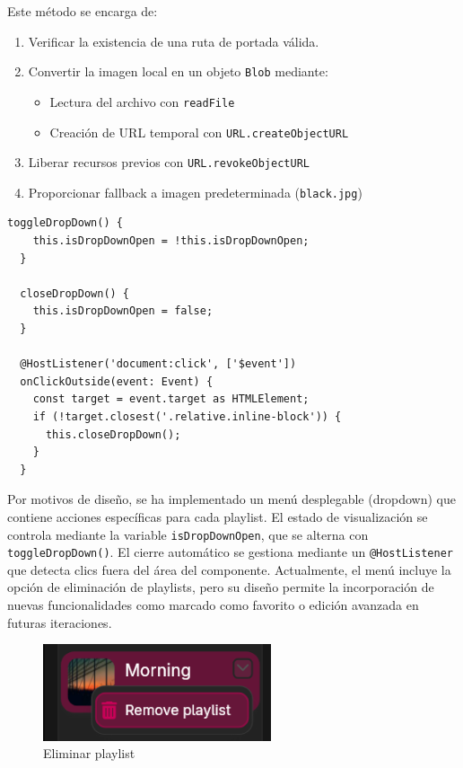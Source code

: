 \documentclass[11pt, a4paper]{article}
\begin{document}
                Este método se encarga de:
                \begin{enumerate}
                    \item Verificar la existencia de una ruta de portada válida.
                    \item Convertir la imagen local en un objeto \verb|Blob| mediante:
                    \begin{itemize}
                        \item Lectura del archivo con \verb|readFile|
                        \item Creación de URL temporal con \verb|URL.createObjectURL|
                    \end{itemize}
                    \item Liberar recursos previos con \verb|URL.revokeObjectURL|
                    \item Proporcionar fallback a imagen predeterminada (\verb|black.jpg|)
                \end{enumerate}

                \begin{lstlisting}[caption={Dropdown}]
toggleDropDown() {
    this.isDropDownOpen = !this.isDropDownOpen;
  }

  closeDropDown() {
    this.isDropDownOpen = false;
  }

  @HostListener('document:click', ['$event'])
  onClickOutside(event: Event) {
    const target = event.target as HTMLElement;
    if (!target.closest('.relative.inline-block')) {
      this.closeDropDown();
    }
  }
                \end{lstlisting}

                Por motivos de diseño, se ha implementado un menú desplegable (dropdown) que contiene acciones específicas para cada playlist. El estado de visualización se controla mediante la variable \verb|isDropDownOpen|, que se alterna con \verb|toggleDropDown()|. El cierre automático se gestiona mediante un \verb|@HostListener| que detecta clics fuera del área del componente. Actualmente, el menú incluye la opción de eliminación de playlists, pero su diseño permite la incorporación de nuevas funcionalidades como marcado como favorito o edición avanzada en futuras iteraciones.

                \begin{figure}[H]
                    \centering
                    \includegraphics[width=0.6\textwidth]{media/screenshots/remove_playlist.png}
                    \caption{Eliminar playlist}
                    \label{fig:eliminar playlist}
                \end{figure}
\end{document}
